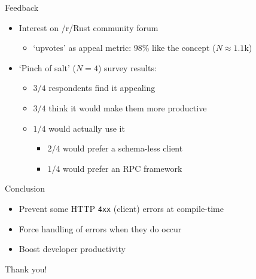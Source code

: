 \documentclass[10pt]{beamer}
\begin{document}
\begin{frame}{Feedback}

    \begin{itemize}[<+->]
        \item Interest on /r/Rust community forum
        \begin{itemize}
            \item `upvotes' as appeal metric: 98\% like the concept ($N \approx 1.1$k)
        \end{itemize}
        \item `Pinch of salt' ($N = 4$) survey results:
        \begin{itemize}
            \item $3/4$ respondents find it appealing
            \item $3/4$ think it would make them more productive
            \item $1/4$ would actually use it
            \begin{itemize}[<.(1)->]
                \item $2/4$ would prefer a schema-less client
                \item $1/4$ would prefer an RPC framework
            \end{itemize}\pause
        \end{itemize}
    \end{itemize}

\end{frame}

\begin{frame}{Conclusion}

    \begin{itemize}[<+->]
        \item Prevent some HTTP \texttt{4xx} (client) errors at compile-time
        \item Force handling of errors when they do occur
        \item Boost developer productivity
    \end{itemize}

\end{frame}

\begin{frame}[standout]
    Thank you!
\end{frame}
\end{document}

